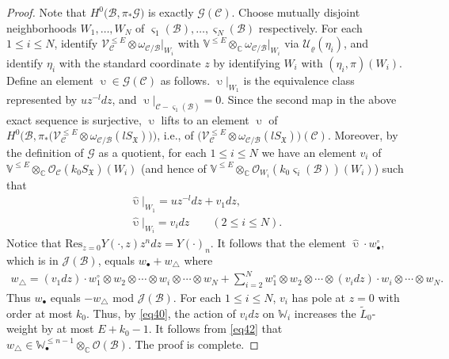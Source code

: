 \documentclass[11pt,b5paper,notitlepage]{article}
\theoremstyle{definition}
\theoremstyle{plain}
\newcommand{\fk}{\mathfrak}
\newcommand{\mc}{\mathcal}
\newcommand{\wtd}{\widetilde}
\newcommand{\wht}{\widehat}
\newcommand{\Res}{\mathrm{Res}}
\newcommand{\scr}{\mathscr}
\newcommand{\sgm}{\varsigma}
\newcommand{\blt}{\bullet}
\newcommand{\Vbb}{\mathbb V}
\newcommand{\Wbb}{\mathbb W}
\newcommand{\Cbb}{\mathbb C}
\numberwithin{equation}{section}
\begin{document}
\begin{proof}
	Note that $H^0\big(\mc B,\pi_*\scr G\big)$ is exactly $\scr G(\mc C)$. Choose mutually disjoint neighborhoods $W_1,\dots,W_N$ of $\sgm_1(\mc B),\dots,\sgm_N(\mc B)$ respectively. For each $1\leq i\leq N$, identify $\scr V_{\mc C}^{\leq E}\otimes\omega_{\mc C/\mc B}|_{W_i}$ with $\Vbb^{\leq E}\otimes_\Cbb\omega_{\mc C/\mc B}|_{W_i}$ via $\mc U_\varrho(\eta_i)$, and identify $\eta_i$ with the standard coordinate $z$ by identifying $W_i$ with $(\eta_i,\pi)(W_i)$. Define an element $\upupsilon\in\scr G(\mc C)$ as follows. $\upupsilon|_{W_1}$ is the equivalence class represented by $uz^{-l}dz$, and $\upupsilon|_{\mc C-\sgm_1(\mc B)}=0$. Since the second map in the above exact sequence is surjective, $\upupsilon$ lifts to an element $\wht\upupsilon$ of $H^0\big(\mc B,\pi_*\big(\scr V_{\mc C}^{\leq E}\otimes\omega_{\mc C/\mc B}(lS_{\fk X})\big)\big)$, i.e., of $\big(\scr V_{\mc C}^{\leq E}\otimes\omega_{\mc C/\mc B}(lS_{\fk X})\big)(\mc C)$. Moreover, by the definition of $\scr G$ as a quotient, for each $1\leq i\leq N$ we have an element $v_i$ of $\Vbb^{\leq E}\otimes_\Cbb\scr O_{\mc C}(k_0 S_{\fk X})(W_i)$ (and hence of $\Vbb^{\leq E}\otimes_\Cbb\scr O_{W_i}(k_0 \sgm_i(\mc B))(W_i)$) such that
	\begin{gather*}
	\wht\upupsilon|_{W_1}=uz^{-l}dz+v_1dz,\\
	\wht\upupsilon|_{W_i}=v_idz\qquad(2\leq i\leq N).
	\end{gather*}
	Notice that $\Res_{z=0}Y(\cdot,z)z^ndz=Y(\cdot)_n$. It follows that the element $\wht\upupsilon\cdot w_\blt^\circ$, which is in $\scr J(\mc B)$,  equals $w_\blt+w_\triangle$ where
	\begin{align*}
	w_\triangle=(v_1dz)\cdot w_1^\circ\otimes w_2\otimes\cdots \otimes  w_i\otimes\cdots\otimes w_N+\sum_{i=2}^Nw_1^\circ\otimes w_2\otimes\cdots \otimes (v_idz)\cdot w_i\otimes\cdots\otimes w_N.
	\end{align*}
	Thus $w_\blt$ equals $-w_\triangle$ mod $\scr J(\mc B)$. For each $1\leq i\leq N$, $v_i$ has pole at $z=0$ with order at most $k_0$. Thus, by \eqref{eq40}, the action of $v_idz$ on $\Wbb_i$ increases the $\wtd L_0$-weight by at most $E+k_0-1$. It follows from \eqref{eq42} that $w_\triangle\in\Wbb_\blt^{\leq {n-1}}\otimes_\Cbb\scr O(\mc B)$. The proof is complete.
\end{proof}
\end{document}
